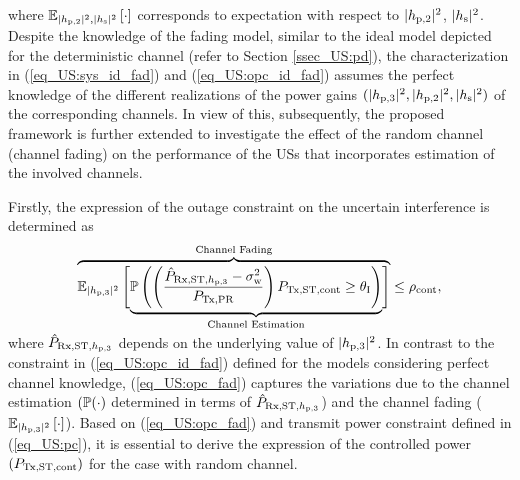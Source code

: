 where ${\mathbb E}_{|h_{\text{p,2}}|^2, |h_{\text{s}}|^2}\left[ \cdot \right]$ corresponds to expectation with respect to $|h_{\text{p,2}}|^2$, $|h_{\text{s}}|^2$.
Despite the knowledge of the fading model, similar to the ideal model depicted for the deterministic channel (refer to Section \ref{ssec_US:pd}), the characterization in (\ref{eq_US:sys_id_fad}) and (\ref{eq_US:opc_id_fad}) assumes the perfect knowledge of the different realizations of the power gains $(|h_{\text{p,3}}|^2, |h_{\text{p,2}}|^2, |h_{\text{s}}|^2)$ of the corresponding channels. In view of this, subsequently, the proposed framework is further extended to investigate the effect of the random channel (channel fading) on the performance of the USs that incorporates estimation of the involved channels.

Firstly, the expression of the outage constraint on the uncertain interference is determined as 
\begin{align}
\smash[b]{\overbrace{{\mathbb E}_{|h_{\text{p,3}}|^2}\left[ \smash[b]{\underbrace{\mathbb P\left( \left( \frac{\hat{P}_{\text{Rx,ST,$h_{\text{p,3}}$}}- \sigma^2_{\text{w}}}{P_{\text{Tx,PR}}}\right) P_{\text{Tx,ST,cont}} \ge \theta_{\text{I}} \right)}_{\text{Channel Estimation}}} \right]}^{\text{Channel Fading}}} \le \rho_{\text{cont}}, \label{eq_US:opc_fad} \\[0.5em] \nonumber 
\end{align}
where $\hat{P}_{\text{Rx,ST,$h_{\text{p,3}}$}}$ depends on the underlying value of $|h_{\text{p,3}}|^2$. In contrast to the constraint in (\ref{eq_US:opc_id_fad}) defined for the models considering perfect channel knowledge, (\ref{eq_US:opc_fad}) captures the variations due to the channel estimation $(\mathbb P(\cdot)$ determined in terms of $\hat{P}_{\text{Rx,ST,$h_{\text{p,3}}$}}$) and the channel fading (${\mathbb E}_{|h_{\text{p,3}}|^2}\left[ \cdot \right]$). Based on (\ref{eq_US:opc_fad}) and transmit power constraint defined in (\ref{eq_US:pc}), it is essential to derive the expression of the controlled power $(P_{\text{Tx,ST,cont}})$ for the case with random channel.

